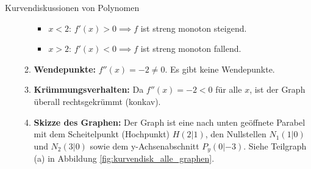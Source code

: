 \begin{loesungsumgebung}{Kurvendiskussionen von Polynomen}
\begin{enumerate}[label=(\alph*)]
\begin{enumerate}[label=\arabic*.]
        \begin{itemize}
            \item $x < 2$: $f'(x) > 0 \implies f$ ist streng monoton steigend.
            \item $x > 2$: $f'(x) < 0 \implies f$ ist streng monoton fallend.
        \end{itemize}
        \item \textbf{Wendepunkte:} $f''(x) = -2 \neq 0$. Es gibt keine Wendepunkte.
        \item \textbf{Krümmungsverhalten:} Da $f''(x) = -2 < 0$ für alle $x$, ist der Graph überall rechtsgekrümmt (konkav).
        \item \textbf{Skizze des Graphen:} Der Graph ist eine nach unten geöffnete Parabel mit dem Scheitelpunkt (Hochpunkt) $H(2|1)$, den Nullstellen $N_1(1|0)$ und $N_2(3|0)$ sowie dem y-Achsenabschnitt $P_y(0|-3)$. Siehe Teilgraph (a) in Abbildung \ref{fig:kurvendisk_alle_graphen}.
    \end{enumerate}


\end{enumerate}
\end{loesungsumgebung}
